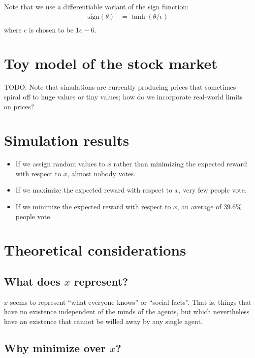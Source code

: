 \documentclass{article}
\begin{document}
Note that we use a differentiable variant of the sign function:
\begin{align*}
\mathrm{sign}(\theta) &= \tanh \left(\theta / \epsilon \right)\\
\end{align*}
where $\epsilon$ is chosen to be $1e-6$.

\section{Toy model of the stock market}

TODO. Note that simulations are currently producing prices that sometimes
spiral off to huge values or tiny values; how do we incorporate real-world
limits on prices?

\section{Simulation results}

\begin{itemize}
\item If we assign random values to $x$ rather than minimizing the expected
  reward with respect to $x$, almost nobody votes.
\item If we maximize the expected reward with respect to $x$, very few people
  vote.
\item If we minimize the expected reward with respect to $x$, an average of
  $39.6\%$ people vote.
\end{itemize}

\section{Theoretical considerations}

\subsection{What does $x$ represent?}

$x$ seems to represent ``what everyone knows'' or ``social facts''. That is,
things that have no existence independent of the minds of the agents, but which
nevertheless have an existence that cannot be willed away by any single agent.

\subsection{Why minimize over $x$?}
\end{document}
